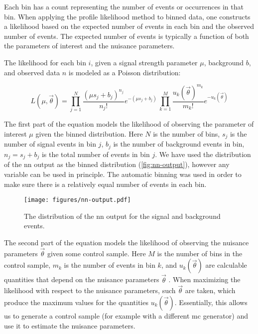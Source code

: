 Each bin has a count representing the number of events or occurrences in that bin. When applying the profile likelihood
method to binned data, one constructs a likelihood based on the expected number of events in each bin and the observed
number of events. The expected number of events is typically a function of both the parameters of interest and the
nuisance parameters.

The likelihood for each bin $i$, given a signal strength parameter $\mu$, background $b$, and observed data $n$
is modeled as a Poisson distribution:

\begin{equation}
    \label{eq:likelihood}
    L(\mu, \vec{\theta}) = \prod_{j=1}^{N} \frac{(\mu s_j + b_j)^{n_j}}{n_j!} e^{-(\mu s_j + b_j)} \,
    \prod_{k=1}^{M} \frac{u_k(\vec{\theta})^{m_k}}{m_k!} e^{-u_k(\vec{\theta})}
\end{equation}

The first part of the equation models the likelihood of observing the parameter of interest $\mu$ given the binned
distribution. Here $N$ is the number of bins, $s_j$ is the number of signal events in bin $j$, $b_j$ is the
number of background events in bin, $n_j = s_j + b_j$ is the total number of events in bin $j$. We have used the
distribution of the \gls{nn} output as the binned distribution (\autoref{fig:nn-output}), however any variable can be
used in principle. The automatic binning was used in order to make sure there is a relatively equal number of events in
each bin.

\begin{figure}
    \centering
    \texttt{[image: figures/nn-output.pdf]}
    \caption{The distribution of the \gls{nn} output for the signal and background events.}
    \label{fig:nn-output}
\end{figure}

The second part of the equation models the likelihood of observing the nuisance parameters $\vec{\theta}$ given some
control sample. Here $M$ is the number of bins in the control sample, $m_k$ is the number of events in bin $k$, and
$u_k(\vec{\theta})$ are calculable quantities that depend on the nuisance parameters $\vec{\theta}$ \cite{statistical}.
When maximizing the likelihood with respect to the nuisance parameters, such $\vec{\theta}$ are taken, which produce
the maximum values for the quantities $u_k(\vec{\theta})$. Essentially, this allows us to generate a control sample
(for example with a different \gls{mc} generator) and use it to estimate the nuisance parameters.

